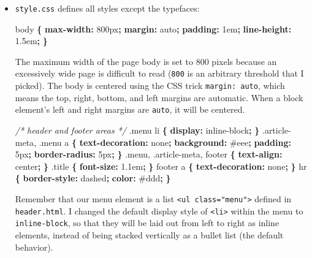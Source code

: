\documentclass[12pt,]{krantz}
\makeatletter
\newenvironment{Shaded}{\begin{snugshade}}{\end{snugshade}}
\newcommand{\KeywordTok}[1]{\textcolor[rgb]{0.13,0.29,0.53}{\textbf{#1}}}
\newcommand{\DataTypeTok}[1]{\textcolor[rgb]{0.13,0.29,0.53}{#1}}
\newcommand{\FloatTok}[1]{\textcolor[rgb]{0.00,0.00,0.81}{#1}}
\newcommand{\CommentTok}[1]{\textcolor[rgb]{0.56,0.35,0.01}{\textit{#1}}}
\newcommand{\NormalTok}[1]{#1}
\newenvironment{kframe}{%
\medskip{}
\setlength{\fboxsep}{.8em}
 \def\at@end@of@kframe{}%
 \ifinner\ifhmode%
  \def\at@end@of@kframe{\end{minipage}}%
  \begin{minipage}{\columnwidth}%
 \fi\fi%
 \def\FrameCommand##1{\hskip\@totalleftmargin \hskip-\fboxsep
 \colorbox{shadecolor}{##1}\hskip-\fboxsep
     \hskip-\linewidth \hskip-\@totalleftmargin \hskip\columnwidth}%
 \MakeFramed {\advance\hsize-\width
   \@totalleftmargin\z@ \linewidth\hsize
   \@setminipage}}%
 {\par\unskip\endMakeFramed%
 \at@end@of@kframe}
\renewenvironment{Shaded}{\begin{kframe}}{\end{kframe}}
\theoremstyle{definition}
\theoremstyle{definition}
\theoremstyle{definition}
\theoremstyle{remark}
\makeatother
\begin{document}
\begin{itemize}
\item
  \texttt{style.css} defines all styles except the typefaces:

\begin{Shaded}
\begin{Highlighting}[]
\NormalTok{body }\KeywordTok{\{}
  \KeywordTok{max-width:} \DataTypeTok{800px}\KeywordTok{;}
  \KeywordTok{margin:} \DataTypeTok{auto}\KeywordTok{;}
  \KeywordTok{padding:} \DataTypeTok{1em}\KeywordTok{;}
  \KeywordTok{line-height:} \DataTypeTok{1.5em}\KeywordTok{;}
\KeywordTok{\}}
\end{Highlighting}
\end{Shaded}

  The maximum width of the page body is set to 800 pixels because an
  excessively wide page is difficult to read (\texttt{800} is an
  arbitrary threshold that I picked). The body is centered using the CSS
  trick \texttt{margin:\ auto}, which means the top, right, bottom, and
  left margins are automatic. When a block element's left and right
  margins are \texttt{auto}, it will be centered.

\begin{Shaded}
\begin{Highlighting}[]
\CommentTok{/* header and footer areas */}
\FloatTok{.menu}\NormalTok{ li }\KeywordTok{\{} \KeywordTok{display:} \DataTypeTok{inline-block}\KeywordTok{;} \KeywordTok{\}}
\FloatTok{.article-meta}\NormalTok{, }\FloatTok{.menu}\NormalTok{ a }\KeywordTok{\{}
  \KeywordTok{text-decoration:} \DataTypeTok{none}\KeywordTok{;}
  \KeywordTok{background:} \DataTypeTok{#eee}\KeywordTok{;}
  \KeywordTok{padding:} \DataTypeTok{5px}\KeywordTok{;}
  \KeywordTok{border-radius:} \DataTypeTok{5px}\KeywordTok{;}
\KeywordTok{\}}
\FloatTok{.menu}\NormalTok{, }\FloatTok{.article-meta}\NormalTok{, footer }\KeywordTok{\{} \KeywordTok{text-align:} \DataTypeTok{center}\KeywordTok{;} \KeywordTok{\}}
\FloatTok{.title} \KeywordTok{\{} \KeywordTok{font-size:} \DataTypeTok{1.1em}\KeywordTok{;} \KeywordTok{\}}
\NormalTok{footer a }\KeywordTok{\{} \KeywordTok{text-decoration:} \DataTypeTok{none}\KeywordTok{;} \KeywordTok{\}}
\NormalTok{hr }\KeywordTok{\{}
  \KeywordTok{border-style:} \DataTypeTok{dashed}\KeywordTok{;}
  \KeywordTok{color:} \DataTypeTok{#ddd}\KeywordTok{;}
\KeywordTok{\}}
\end{Highlighting}
\end{Shaded}

  Remember that our menu element is a list
  \texttt{\textless{}ul\ class="menu"\textgreater{}} defined in
  \texttt{header.html}. I changed the default display style of
  \texttt{\textless{}li\textgreater{}} within the menu to
  \texttt{inline-block}, so that they will be laid out from left to
  right as inline elements, instead of being stacked vertically as a
  bullet list (the default behavior).


\end{itemize}
\end{document}
